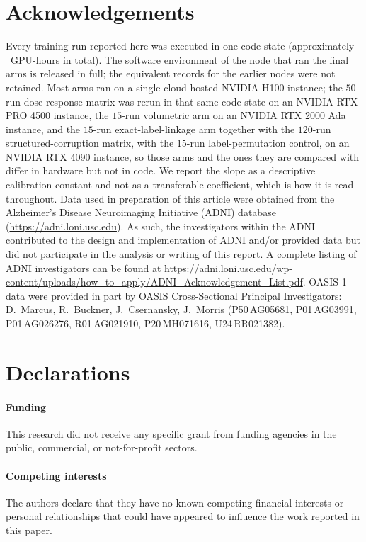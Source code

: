 \documentclass[pdflatex,sn-vancouver-num]{sn-jnl}
\begin{document}
\section*{Acknowledgements}
Every training run reported here was executed in one code state
(approximately \GpuHours{}~GPU-hours in total). The software environment of
the node that ran the final arms is released in full; the equivalent records
for the earlier nodes were not retained. Most arms
ran on a single cloud-hosted NVIDIA H100 instance; the $50$-run
dose-response matrix was rerun in that same code state on an NVIDIA RTX
PRO 4500 instance, the $15$-run volumetric arm on an NVIDIA RTX 2000
Ada instance, and the $15$-run exact-label-linkage arm together with the
$120$-run structured-corruption matrix, with the $15$-run
label-permutation control, on an NVIDIA RTX 4090 instance, so those
arms and the ones they are compared with differ in hardware but not in
code. We report the slope as a descriptive
calibration constant and not as a transferable coefficient, which is
how it is read throughout. Data used in preparation of this article
were obtained from the Alzheimer's Disease Neuroimaging Initiative
(ADNI) database (\url{https://adni.loni.usc.edu}). As such, the
investigators within the ADNI contributed to the design and
implementation of ADNI and/or provided data but did not participate in
the analysis or writing of this report. A complete listing of ADNI
investigators can be found at
\url{https://adni.loni.usc.edu/wp-content/uploads/how_to_apply/ADNI_Acknowledgement_List.pdf}.
OASIS-1 data were provided in part by OASIS Cross-Sectional Principal
Investigators: D.\ Marcus, R.\ Buckner, J.\ Csernansky, J.\ Morris
(P50\,AG05681, P01\,AG03991, P01\,AG026276, R01\,AG021910,
P20\,MH071616, U24\,RR021382).
\section*{Declarations}

\paragraph*{Funding}
This research did not receive any specific grant from funding
agencies in the public, commercial, or not-for-profit sectors.

\paragraph*{Competing interests}
The authors declare that they have no known competing financial
interests or personal relationships that could have appeared to
influence the work reported in this paper.
\end{document}
